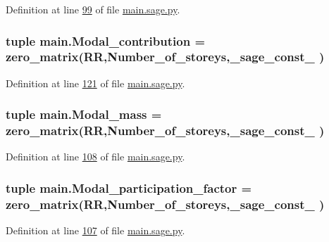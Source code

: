 Definition at line \hyperlink{main_8sage_8py_source_l00099}{99} of file \hyperlink{main_8sage_8py_source}{main.\+sage.\+py}.

\hypertarget{namespacemain_ab273c2ae46514d6ec3d905c30cbb5a1b}{}
\subsubsection[{Modal\+\_\+contribution}]{\setlength{\rightskip}{0pt plus 5cm}tuple main.\+Modal\+\_\+contribution = zero\+\_\+matrix(R\+R,Number\+\_\+of\+\_\+storeys,\+\_\+sage\+\_\+const\+\_ )}\label{namespacemain_ab273c2ae46514d6ec3d905c30cbb5a1b}


Definition at line \hyperlink{main_8sage_8py_source_l00121}{121} of file \hyperlink{main_8sage_8py_source}{main.\+sage.\+py}.

\hypertarget{namespacemain_a176940b2d446033050ac092436f63974}{}
\subsubsection[{Modal\+\_\+mass}]{\setlength{\rightskip}{0pt plus 5cm}tuple main.\+Modal\+\_\+mass = zero\+\_\+matrix(R\+R,Number\+\_\+of\+\_\+storeys,\+\_\+sage\+\_\+const\+\_ )}\label{namespacemain_a176940b2d446033050ac092436f63974}


Definition at line \hyperlink{main_8sage_8py_source_l00108}{108} of file \hyperlink{main_8sage_8py_source}{main.\+sage.\+py}.

\hypertarget{namespacemain_a936ce857e8e4f4855af1cc5bf2635191}{}
\subsubsection[{Modal\+\_\+participation\+\_\+factor}]{\setlength{\rightskip}{0pt plus 5cm}tuple main.\+Modal\+\_\+participation\+\_\+factor = zero\+\_\+matrix(R\+R,Number\+\_\+of\+\_\+storeys,\+\_\+sage\+\_\+const\+\_ )}\label{namespacemain_a936ce857e8e4f4855af1cc5bf2635191}


Definition at line \hyperlink{main_8sage_8py_source_l00107}{107} of file \hyperlink{main_8sage_8py_source}{main.\+sage.\+py}.

